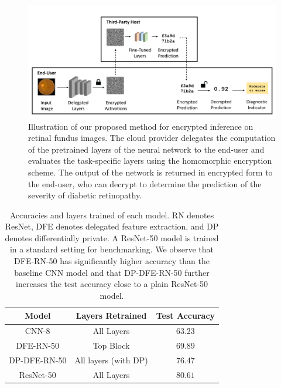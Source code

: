 \documentclass[conference]{IEEEtran}
\begin{document}
\begin{figure}[!htbp]
\centering
\includegraphics[width=5.5in]{figures/method_figure_v2.png}
\caption{Illustration of our proposed method for encrypted inference on retinal fundus images. The cloud provider delegates the computation of the pretrained layers of the neural network to the end-user and evaluates the task-specific layers using the homomorphic encryption scheme. The output of the network is returned in encrypted form to the end-user, who can decrypt to determine the prediction of the severity of diabetic retinopathy.}
\label{fig:method}
\end{figure}


\begin{table}[!htbp]
    \centering
    \footnotesize
    \begin{tabular}{|c|c|c|} \hline
    Model & Layers Retrained & Test Accuracy \\ \hline
    CNN-8 & All Layers & 63.23  \\ 
    DFE-RN-50 & Top Block & 69.89  \\
    DP-DFE-RN-50 & All layers (with DP) & 76.47  \\
    ResNet-50 & All Layers & $\mathbf{80.61}$ \\  \hline
    \end{tabular}
    \caption{Accuracies and layers trained of each model. RN denotes ResNet, DFE denotes delegated feature extraction, and DP denotes differentially private.  A ResNet-50 model is trained in a standard setting for benchmarking. We observe that DFE-RN-50 has significantly higher accuracy than the baseline CNN model and that DP-DFE-RN-50 further increases the test accuracy close to a plain ResNet-50 model.  }
    \label{tab:accuracy_results}
\end{table}
\end{document}
